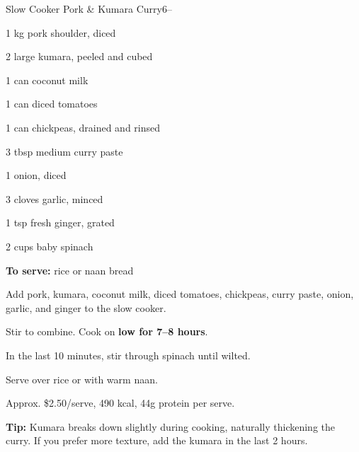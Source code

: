\begin{recipebox}{Slow Cooker Pork \& Kumara Curry}{6}{--}
\begin{ingredients}
  \item 1 kg pork shoulder, diced
  \item 2 large kumara, peeled and cubed
  \item 1 can coconut milk
  \item 1 can diced tomatoes
  \item 1 can chickpeas, drained and rinsed
  \item 3 tbsp medium curry paste
  \item 1 onion, diced
  \item 3 cloves garlic, minced
  \item 1 tsp fresh ginger, grated
  \item 2 cups baby spinach
  \item \textbf{To serve:} rice or naan bread
\end{ingredients}

\begin{method}
  \item Add pork, kumara, coconut milk, diced tomatoes, chickpeas, curry paste, onion, garlic, and ginger to the slow cooker.
  \item Stir to combine. Cook on \textbf{low for 7--8 hours}.
  \item In the last 10 minutes, stir through spinach until wilted.
  \item Serve over rice or with warm naan.
\end{method}

\begin{notelist}
  \item Approx. \$2.50/serve, 490 kcal, 44g protein per serve.
  \item \textbf{Tip:} Kumara breaks down slightly during cooking, naturally thickening the curry. If you prefer more texture, add the kumara in the last 2 hours.
\end{notelist}
\end{recipebox}
